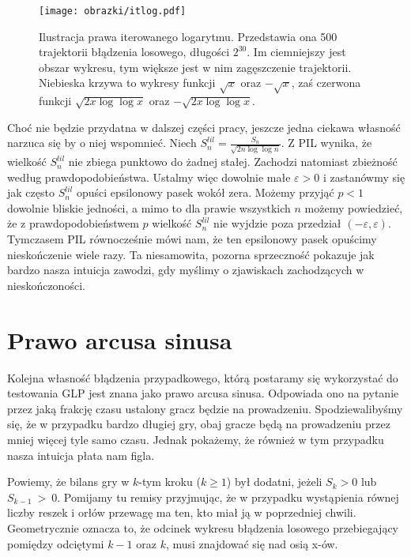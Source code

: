 \documentclass[a4paper,11pt,oneside]{book}
\newcommand{\Slil}[1]{S^{lil}_#1}
\theoremstyle{definition}
\begin{document}
\begin{figure}[!ht]
 \centering
 \texttt{[image: obrazki/itlog.pdf]}
 \caption{Ilustracja prawa iterowanego logarytmu. Przedstawia ona 500 trajektorii błądzenia losowego, długości $2^{30}$. Im ciemniejszy jest obszar wykresu, tym większe jest w nim zagęszczenie trajektorii. Niebieska krzywa to wykresy funkcji $\sqrt{x}$ oraz $-\sqrt{x}$, zaś czerwona funkcji $\sqrt{2 x \log \log x}$ oraz $-\sqrt{2 x \log \log x}$.}
 \label{fig:itlog}
\end{figure}

Choć nie będzie przydatna w dalszej części pracy, jeszcze jedna ciekawa własność narzuca się by o niej wspomnieć. Niech $\Slil{n} = \frac{S_n}{\sqrt{2n \log \log n}}$. Z PIL wynika, że wielkość $\Slil{n}$ nie zbiega punktowo do żadnej stałej. Zachodzi natomiast zbieżność według prawdopodobieństwa. Ustalmy więc dowolnie małe $\varepsilon > 0$ i zastanówmy się jak często $\Slil{n}$ opuści epsilonowy pasek wokół zera. Możemy przyjąć $p < 1$ dowolnie bliskie jedności, a mimo to dla prawie wszystkich $n$ możemy powiedzieć, że z prawdopodobieństwem $p$ wielkość $\Slil{n}$ nie wyjdzie poza przedział $(-\varepsilon, \varepsilon)$. Tymczasem PIL równocześnie mówi nam, że ten epsilonowy pasek opuścimy nieskończenie wiele razy. Ta niesamowita, pozorna sprzeczność pokazuje jak bardzo nasza intuicja zawodzi, gdy myślimy o zjawiskach zachodzących w nieskończoności.

\section{Prawo arcusa sinusa}
\label{par:asin}

Kolejna własność błądzenia przypadkowego, którą postaramy się wykorzystać do testowania GLP jest znana jako prawo arcusa sinusa. Odpowiada ono na pytanie przez jaką frakcję czasu ustalony gracz będzie na prowadzeniu. Spodziewalibyśmy się, że w przypadku bardzo długiej gry, obaj gracze będą na prowadzeniu przez mniej więcej tyle samo czasu. Jednak pokażemy, że również w tym przypadku nasza intuicja płata nam figla.

Powiemy, że bilans gry w $k$-tym kroku ($k \geq 1$) był dodatni, jeżeli $S_k > 0$ lub $S_{k-1}~>~0$. Pomijamy tu remisy przyjmując, że w przypadku wystąpienia równej liczby reszek i orłów przewagę ma ten, kto miał ją w poprzedniej chwili. Geometrycznie oznacza to, że odcinek wykresu błądzenia losowego przebiegający pomiędzy odciętymi $k-1$ oraz $k$, musi znajdować się nad osią x-ów.
\end{document}
